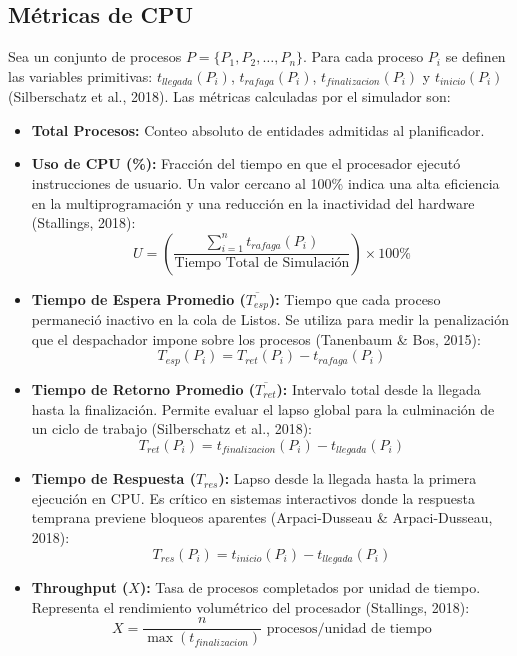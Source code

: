 \documentclass[12pt,a4paper]{article}
\begin{document}
\subsection{Métricas de CPU}
Sea un conjunto de procesos $P = \{P_1, P_2, \dots, P_n\}$. Para cada proceso $P_i$ se definen las variables primitivas: $t_{llegada}(P_i)$, $t_{rafaga}(P_i)$, $t_{finalizacion}(P_i)$ y $t_{inicio}(P_i)$ (Silberschatz et al., 2018). Las métricas calculadas por el simulador son:

\begin{itemize}
    \item \textbf{Total Procesos:} Conteo absoluto de entidades admitidas al planificador.
    \item \textbf{Uso de CPU (\%):} Fracción del tiempo en que el procesador ejecutó instrucciones de usuario. Un valor cercano al 100\% indica una alta eficiencia en la multiprogramación y una reducción en la inactividad del hardware (Stallings, 2018):
    \begin{equation}
        U = \left( \frac{\sum_{i=1}^{n} t_{rafaga}(P_i)}{\text{Tiempo Total de Simulación}} \right) \times 100\%
    \end{equation}
    \item \textbf{Tiempo de Espera Promedio ($\overline{T_{esp}}$):} Tiempo que cada proceso permaneció inactivo en la cola de Listos. Se utiliza para medir la penalización que el despachador impone sobre los procesos (Tanenbaum \& Bos, 2015):
    \begin{equation}
        T_{esp}(P_i) = T_{ret}(P_i) - t_{rafaga}(P_i)
    \end{equation}
    \item \textbf{Tiempo de Retorno Promedio ($\overline{T_{ret}}$):} Intervalo total desde la llegada hasta la finalización. Permite evaluar el lapso global para la culminación de un ciclo de trabajo (Silberschatz et al., 2018):
    \begin{equation}
        T_{ret}(P_i) = t_{finalizacion}(P_i) - t_{llegada}(P_i)
    \end{equation}
    \item \textbf{Tiempo de Respuesta ($T_{res}$):} Lapso desde la llegada hasta la primera ejecución en CPU. Es crítico en sistemas interactivos donde la respuesta temprana previene bloqueos aparentes (Arpaci-Dusseau \& Arpaci-Dusseau, 2018):
    \begin{equation}
        T_{res}(P_i) = t_{inicio}(P_i) - t_{llegada}(P_i)
    \end{equation}
    \item \textbf{Throughput ($X$):} Tasa de procesos completados por unidad de tiempo. Representa el rendimiento volumétrico del procesador (Stallings, 2018):
    \begin{equation}
        X = \frac{n}{\max(t_{finalizacion})} \text{ procesos/unidad de tiempo}
    \end{equation}
\end{itemize}
\end{document}
